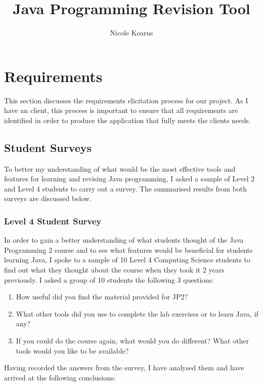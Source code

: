 \documentclass{article}
\begin{document}
\title{Java Programming Revision Tool}
\author{Nicole Kearns}
\maketitle
\tableofcontents

\newpage

\section{Requirements}

This section discusses the requirements elicitation process for our project. As I have an client, this process is important to ensure that all requirements are identified in order to produce the application that fully meets the clients needs.

\subsection{Student Surveys}

To better my understanding of what would be the most effective tools and features for learning and revising Java programming, I asked a sample of Level 2 and Level 4 students to carry out a survey. The summarised results from both surveys are discussed below.

\subsubsection{Level 4 Student Survey}

In order to gain a better understanding of what students thought of the Java Programming 2 course and to see what features would be beneficial for students learning Java, I spoke to a sample of 10 Level 4 Computing Science students to find out what they thought about the course when they took it 2 years previously. I asked a group of 10 students the following 3 questions:

\begin{enumerate}
\item How useful did you find the material provided for JP2? 
\item What other tools did you use to complete the lab exercises or to learn Java, if any?
\item If you could do the course again, what would you do different? What other tools would you like to be available?
\end{enumerate}

Having recorded the answers from the survey, I have analysed them and have arrived at the following conclusions:\\
\end{document}
